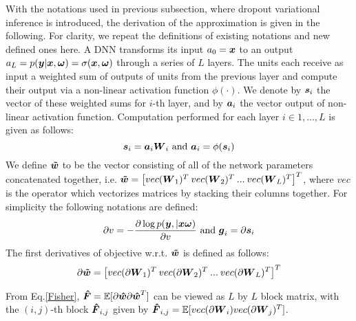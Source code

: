 With the notations used in previous subsection, where dropout variational inference is introduced, the derivation of the approximation is given in the following. For clarity, we repeat the definitions of existing notations and new defined ones here. A DNN transforms its input $a_0 = \boldsymbol x$ to an output $a_L=p(\boldsymbol y| \boldsymbol x, \boldsymbol \omega)=\sigma(\boldsymbol x, \boldsymbol \omega)$ through a series of $L$ layers. The units each receive as input a weighted sum of outputs of units from the previous layer and compute their output via a non-linear activation function $\phi(\cdot)$. We denote by $\boldsymbol s_i$ the vector of these weighted sums for $i$-th layer, and by $\boldsymbol a_i$ the vector output of non-linear activation function. Computation performed for each layer $i\in{1,...,L}$ is given as follows:
\begin{equation}
\boldsymbol s_i = \boldsymbol a_i\boldsymbol W_i \text{ and } \boldsymbol a_i = \phi(\boldsymbol s_i)
\end{equation}
We define $\boldsymbol{\tilde{w}}$ to be the vector consisting of all of the network parameters concatenated together, i.e. $\boldsymbol{\tilde{w}}= \big[vec(\boldsymbol W_1)^T \: vec(\boldsymbol W_2)^T \: ...\:vec(\boldsymbol W_L)^T\big]^T$, where $vec$ is the operator which vectorizes matrices by stacking their columns together. 
For simplicity the following notations are defined:
\[
\partial v = -\frac{\partial \log{p(\boldsymbol y, | \boldsymbol x \boldsymbol\omega)}}{\partial v} \text{ and } \boldsymbol g_i = \partial \boldsymbol s_i
\]
The first derivatives of objective w.r.t. $\boldsymbol{\tilde{w}}$ is defined as follows:
\begin{equation}
\begin{aligned}
\partial \boldsymbol{\tilde{w}} = \big[vec(\partial \boldsymbol W_1)^T\: vec(\partial \boldsymbol W_2)^T\: ...\:vec(\partial \boldsymbol W_L)^T\big]^T
\end{aligned}
\end{equation}

From Eq.\ref{Fisher}, $\boldsymbol{\hat F} = \mathbb E[\partial \boldsymbol{\hat w}\partial \boldsymbol{\hat w}^T]$ can be viewed as $L$ by $L$ block matrix, with the $(i,j)$-th block $\boldsymbol{\hat F}_{i,j}$ given by $\boldsymbol{\hat F}_{i,j} = \mathbb E[vec(\partial\boldsymbol W_i)vec(\partial\boldsymbol W_j)^T]$.

